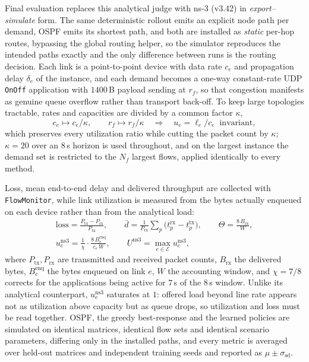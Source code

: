 Final evaluation replaces this analytical judge with \mbox{ns-3} (v3.42) in
\emph{export--simulate} form. The same deterministic rollout emits an explicit node path per
demand, OSPF emits its shortest path, and both are installed as \emph{static} per-hop routes,
bypassing the global routing helper, so the simulator reproduces the intended paths exactly and
the only difference between runs is the routing decision. Each link is a point-to-point device
with data rate $c_e$ and propagation delay $\delta_e$ of the instance, and each demand becomes a
one-way constant-rate UDP \texttt{OnOff} application with $1400$\,B payload sending at $r_f$, so that
congestion manifests as genuine queue overflow rather than transport back-off. To keep large
topologies tractable, rates and capacities are divided by a common factor $\kappa$,
\begin{equation}\label{eq:scale}
c_e \mapsto c_e/\kappa, \qquad r_f \mapsto r_f/\kappa
\quad\Longrightarrow\quad
u_e = \ell_e/c_e \;\; \text{invariant},
\end{equation}
which preserves every utilization ratio while cutting the packet count by $\kappa$; $\kappa = 20$
over an $8$\,s horizon is used throughout, and on the largest instance the demand set is
restricted to the $N_f$ largest flows, applied identically to every method.

Loss, mean end-to-end delay and delivered throughput are collected with \texttt{FlowMonitor},
while link utilization is measured from the bytes actually enqueued on each device rather than
from the analytical load:
\begin{equation}\label{eq:ns3-metrics}
\begin{gathered}
\mathrm{loss} = \frac{P_{\mathrm{tx}} - P_{\mathrm{rx}}}{P_{\mathrm{tx}}},
\qquad
\bar{d} = \frac{1}{P_{\mathrm{rx}}}\sum_{p}\bigl(t^{\mathrm{rx}}_p - t^{\mathrm{tx}}_p\bigr),
\qquad
\Theta = \frac{8\,B_{\mathrm{rx}}}{W}, \\[3pt]
u^{\mathrm{ns3}}_e = \frac{1}{\chi}\cdot\frac{8\,B^{\mathrm{enq}}_e}{c_e\,W},
\qquad
U^{\mathrm{ns3}} = \max_{e\in\mathcal{E}} u^{\mathrm{ns3}}_e ,
\end{gathered}
\end{equation}
where $P_{\mathrm{tx}},P_{\mathrm{rx}}$ are transmitted and received packet counts,
$B_{\mathrm{rx}}$ the delivered bytes, $B^{\mathrm{enq}}_e$ the bytes enqueued on link $e$, $W$
the accounting window, and $\chi = 7/8$ corrects for the applications being active for $7$\,s of
the $8$\,s window. Unlike its analytical counterpart, $u^{\mathrm{ns3}}_e$ saturates at $1$:
offered load beyond line rate appears not as utilization above capacity but as queue drops, so
utilization and loss must be read together. OSPF, the greedy best-response and the learned
policies are simulated on identical matrices, identical flow sets and identical scenario
parameters, differing only in the installed paths, and every metric is averaged over held-out
matrices and independent training seeds and reported as $\mu \pm \sigma_{\mathrm{sd}}$.

